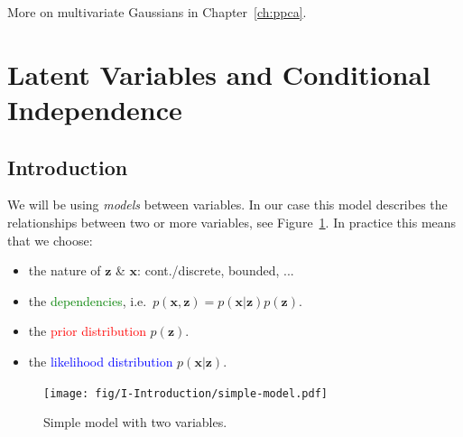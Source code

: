 
More on multivariate Gaussians in Chapter~\ref{ch:ppca}.

\section{Latent Variables and Conditional Independence}
\subsection{Introduction}
We will be using \textit{models} between variables. In our case this model describes the relationships between two or more variables, see Figure~\ref{fig:simple-model}. In practice this means that we choose:
\begin{itemize}
    \item the nature of $\mathbf{z}$ \& $\mathbf{x}$: cont./discrete, bounded, ...
    \item the \textcolor{green}{dependencies}, i.e.\ $p(\mathbf{x},\mathbf{z})=p(\mathbf{x}|\mathbf{z})p(\mathbf{z})$.
    \item the \textcolor{red}{prior distribution} $p(\mathbf{z})$.
    \item the \textcolor{blue}{likelihood distribution} $p(\mathbf{x}|\mathbf{z})$.
\end{itemize}

\begin{figure}[H]
 \centering
 \texttt{[image: fig/I-Introduction/simple-model.pdf]}
 \caption{Simple model with two variables.\label{fig:simple-model}}
\end{figure}


